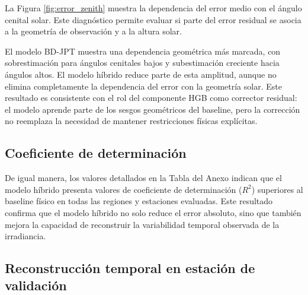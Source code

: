 \documentclass[../main.tex]{subfiles}
\begin{document}
La Figura \ref{fig:error_zenith} muestra la dependencia del error medio con el ángulo cenital solar. Este diagnóstico permite evaluar si parte del error residual se asocia a la geometría de observación y a la altura solar.


El modelo BD-JPT muestra una dependencia geométrica más marcada, con sobrestimación para ángulos cenitales bajos y subestimación creciente hacia ángulos altos. El modelo híbrido reduce parte de esta amplitud, aunque no elimina completamente la dependencia del error con la geometría solar. Este resultado es consistente con el rol del componente HGB como corrector residual: el modelo aprende parte de los sesgos geométricos del baseline, pero la corrección no reemplaza la necesidad de mantener restricciones físicas explícitas.

\clearpage %

\subsection{Coeficiente de determinación}

De igual manera, los valores detallados en la Tabla del Anexo indican que el modelo híbrido presenta valores de coeficiente de determinación ($R^2$) superiores al baseline físico en todas las regiones y estaciones evaluadas. Este resultado confirma que el modelo híbrido no solo reduce el error absoluto, sino que también mejora la capacidad de reconstruir la variabilidad temporal observada de la irradiancia. 


\subsection{Reconstrucción temporal en estación de validación}
\end{document}
